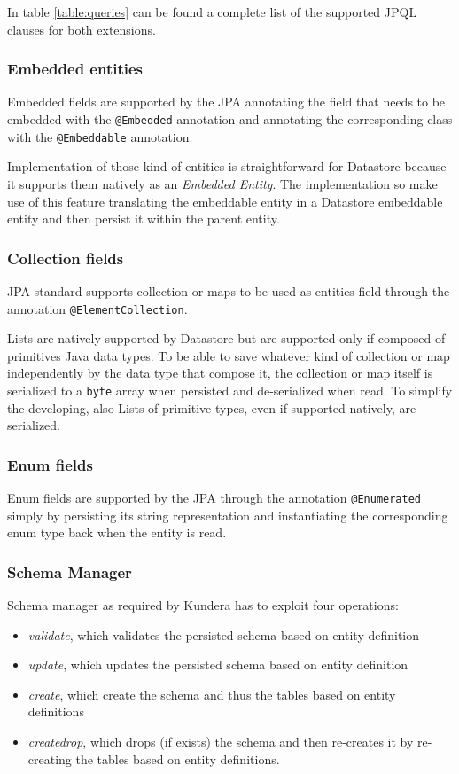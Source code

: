 \newparagraph In table \ref{table:queries} can be found a complete list of the supported JPQL clauses for both extensions.

\subsubsection{Embedded entities}
Embedded fields are supported by the JPA \cite{book:projpa2} annotating the field that needs to be embedded with the \texttt{@Embedded} annotation and annotating the corresponding class with the \texttt{@Embeddable} annotation.

\newparagraph Implementation of those kind of entities is straightforward for Datastore because it supports them natively as an \textit{Embedded Entity}.
\noindent The implementation so make use of this feature translating the embeddable entity in a Datastore embeddable entity and then persist it within the parent entity.

\subsubsection{Collection fields}
JPA standard supports collection or maps to be used as entities field through the annotation \texttt{@ElementCollection}.

\newparagraph Lists are natively supported by Datastore but are supported only if composed of primitives Java data types.
\noindent To be able to save whatever kind of collection or map independently by the data type that compose it, the collection or map itself is serialized to a \texttt{byte} array when persisted and de-serialized when read.
\noindent To simplify the developing, also Lists of primitive types, even if supported natively, are serialized.

\subsubsection{Enum fields}
Enum fields are supported by the JPA through the annotation \texttt{@Enumerated}  simply by persisting its string representation and instantiating the corresponding enum type back when the entity is read.

\subsubsection{Schema Manager}
Schema manager as required by Kundera has to exploit four operations:
\begin{itemize}
\item \textit{validate}, which validates the persisted schema based on entity definition
\item \textit{update}, which updates the persisted schema based on entity definition
\item \textit{create}, which create the schema and thus the tables based on entity definitions
\item \textit{create\textunderscore drop}, which drops (if exists) the schema and then re-creates it by re-creating the tables based on entity definitions.
\end{itemize}

